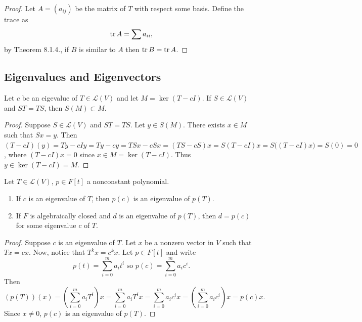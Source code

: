 \begin{proof}
    Let $A = (a_{ij})$ be the matrix of $T$ with respect some basis.
    Define the trace as 
    \[\operatorname{tr} A = \sum a_{ii},\]
    by Theorem 8.1.4., if $B$ is similar to $A$ then $\operatorname{tr} B = \operatorname{tr} A$.
\end{proof}

\subsection{Eigenvalues and Eigenvectors}

\begin{tcolorbox}[title=Problem 1, breakable]
    Let $c$ be an eigevalue of $T \in \mathcal{L}(V)$ and let $M = \ker(T - cI)$.
    If $S \in \mathcal{L}(V)$ and $ST = TS$, then $S(M) \subset M$.
\end{tcolorbox}

\begin{proof}
    Suppose $S \in \mathcal{L}(V)$ and $ST = TS$.
    Let $y \in S(M)$.
    There exists $x \in M$ such that $Sx = y$.
    Then $(T - cI)(y) = Ty - cIy = Ty - cy = TSx - cSx = (TS - cS)x = S(T - cI)x = S\big((T - cI)x\big) = S(0) = 0$,
    where $(T - cI)x = 0$ since $x \in M = \ker(T - cI)$.
    Thus $y \in \ker(T - cI) = M$.
\end{proof}

\newpage
\begin{tcolorbox}[title=Problem 2, breakable]
    Let $T \in \mathcal{L}(V)$, $p \in F[t]$ a nonconstant polynomial.
    \begin{enumerate}
        \item If $c$ is an eigenvalue of $T$, then $p(c)$ is an eigenvalue of $p(T)$.
        \item If $F$ is algebraically closed and $d$ is an eigenvalue of $p(T)$, then $d = p(c)$ for 
        some eigenvalue $c$ of $T$.
    \end{enumerate}
\end{tcolorbox}

\begin{proof}
    Suppose $c$ is an eigenvalue of $T$.
    Let $x$ be a nonzero vector in $V$ such that $Tx = cx$.
    Now, notice that $T^k x = c^k x$.
    Let $p \in F[t]$ and write 
    \[p(t) = \sum_{i = 0}^m a_i t^i \text{ so } p(c) = \sum_{i = 0}^{m} a_i c^i.\]
    Then 
    \[(p(T))(x) = \left(\sum_{i = 0}^m a_i T^i\right)x = \sum_{i = 0}^m a_i T^i x = \sum_{i = 0}^m a_i c^i x = \left(\sum_{i = 0}^m a_i c^i \right) x = p(c) x.\]
    Since $x \neq 0$, $p(c)$ is an eigenvalue of $p(T)$.
\end{proof}

